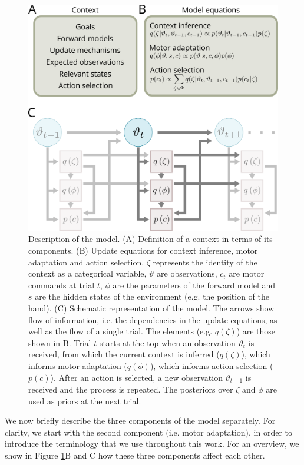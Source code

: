 \documentclass[a4paper,doc,floatsintext,natbib]{apa6}
\def \fref #1{Figure \ref{#1}}     %
\begin{document}
\begin{figure}
\centering
\includegraphics[]{./figures/figure_1.png}
\caption{Description of the model. (A) Definition of a context in terms of its components. (B) Update equations for context inference, motor adaptation and action selection. $\zeta$ represents the identity of the context as a categorical variable, $\vartheta$ are observations, $c_t$ are motor commands at trial $t$, $\phi$ are the parameters of the forward model and $s$ are the hidden states of the environment (e.g. the position of the hand). (C) Schematic representation of the model. The arrows show flow of information, i.e. the dependencies in the update equations, as well as the flow of a single trial. The elements (e.g. $q(\zeta)$) are those shown in B. Trial $t$ starts at the top when an observation $\vartheta_t$ is received, from which the current context is inferred ($q(\zeta)$), which informs motor adaptation ($q(\phi)$), which informs action selection ($p(c)$). After an action is selected, a new observation $\vartheta_{t+1}$ is received and the process is repeated. The posteriors over $\zeta$ and $\phi$ are used as priors at the next trial.}
\label{fig:model}
\end{figure}

We now briefly describe the three components of the model separately. For clarity, we start with the second component (i.e. motor adaptation), in order to introduce the terminology that we use throughout this work. For an overview, we show in \fref{fig:model}B and C how these three components affect each other.
\end{document}

